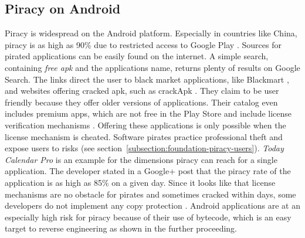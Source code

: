 \subsection{Piracy on Android} \label{subsection:foundation-piracy-android}
Piracy is widespread on the Android platform.
Especially in countries like China, piracy is as high as 90\% due to restricted access to Google Play \cite{piracyRate}.
Sources for pirated applications can be easily found on the internet.
A simple search, containing \textit{free apk} and the applications name, returns plenty of results on Google Search.
The links direct the user to black market applications, like Blackmart \cite{blackmartStore}, and websites offering cracked \gls{apk}, such as crackApk \cite{crackApk}.
They claim to be user friendly because they offer older versions of applications.
Their catalog even includes premium apps, which are not free in the Play Store and include license verification mechanisms \cite{apksfree}.
Offering these applications is only possible when the license mechanism is cheated.
Software pirates practice professional theft and expose users to risks (see section~\ref{subsection:foundation-piracy-users}).
\newline
\textit{Today Calendar Pro} is an example for the dimensions piracy can reach for a single application.
The developer stated in a Google+ post that the piracy rate of the application is as high as 85\% on a given day. \cite{xdaPiracy} \cite{developersPiracy}
Since it looks like that license mechanisms are no obstacle for pirates and sometimes cracked within days, some developers do not implement any copy protection \cite{recodeMonument}.
\newline
Android applications are at an especially high risk for piracy because of their use of bytecode, which is an easy target to reverse engineering as shown in the further proceeding.
